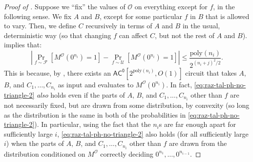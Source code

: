 \documentclass[10pt,a4paper]{article}
\newcommand{\poly}{\mathrm{poly}}
\begin{document}
\begin{proof}[Proof of ]
Suppose we ``fix'' the values of $\mathcal{O}$ on everything except for $f$, in the following sense. We fix $A$ and $B$, except for some particular $f$ in $B$ that is allowed to vary. Then, we define $C$ recursively in terms of $A$ and $B$ in the usual, deterministic way (so that changing $f$ can affect $C$, but not the rest of $A$ and $B$).  implies that:
\begin{equation}
\label{eq:raz-tal-ph-no-triangle-2}
\left|\Pr_{f \sim \mathcal{F}}\left[M^\mathcal{O}\left(0^{n_i}\right) = 1\right]-\Pr_{f \sim \mathcal{U}}\left[M^\mathcal{O}\left(0^{n_i}\right) = 1 \right]\right| \le \frac{\poly(n_i)}{2^{(n_i+j)^2/2}}.
\end{equation}
This is because, by , there exists an $\mathsf{AC^0}\left[2^{\poly(n_i)} , O(1)\right]$ circuit that takes $A$, $B$, and $C_1,\ldots,C_{n_i}$ as input and evaluates to $M^\mathcal{O}\left(0^{n_i}\right)$. In fact, \eqref{eq:raz-tal-ph-no-triangle-2} \textit{also} holds even if the parts of $A$, $B$, and $C_1,\ldots,C_{n_i}$ other than $f$ are not necessarily fixed, but are drawn from some distribution, by convexity (so long as the distribution is the same in both of the probabilities in \eqref{eq:raz-tal-ph-no-triangle-2}). In particular, using the fact that the $n_i$s are far enough apart for sufficiently large $i$, \eqref{eq:raz-tal-ph-no-triangle-2} also holds (for all sufficiently large $i$) when the parts of $A$, $B$, and $C_1,\ldots,C_{n_i}$ other than $f$ are drawn from the distribution conditioned on $M^\mathcal{O}$ correctly deciding $0^{n_1},\dots,0^{n_{i-1}}$.


\end{proof}
\end{document}

